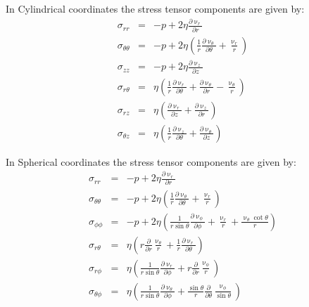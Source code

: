 In Cylindrical coordinates the stress tensor components are given by:
\begin{eqnarray}
\sigma_{rr} &=& -p + 2 \eta \frac{\partial \upnu_r}{\partial r}      \\
\sigma_{\theta\theta} &=& 
 -p + 2\eta \left( \frac{1}{r} \frac{\partial \upnu_\theta}{\partial\theta} +\frac{\upnu_r}{r} \right)    \\
\sigma_{zz} &=& -p + 2 \eta \frac{\partial \upnu_z}{\partial z}      \\
\sigma_{r\theta} &=& \eta \left( \frac{1}{r} \frac{\partial \upnu_r}{\partial \theta} 
+ \frac{\partial \upnu_\theta}{\partial r} - \frac{\upnu_\theta}{r} \right)  \\
\sigma_{rz} &=& \eta \left( \frac{\partial \upnu_r}{\partial z}  + \frac{\partial \upnu_z}{\partial r}\right) \\
\sigma_{\theta z} &=&  \eta \left(  \frac{1}{r} \frac{\partial \upnu_z}{\partial \theta}
+\frac{\partial \upnu_\theta}{\partial z}     \right) 
\end{eqnarray}

In Spherical coordinates the stress tensor components are given by:
\begin{eqnarray}
\sigma_{rr} &=& -p + 2 \eta \frac{\partial \upnu_r}{\partial r}      \\
\sigma_{\theta\theta} &=& 
 -p + 2\eta \left( \frac{1}{r} \frac{\partial \upnu_\theta}{\partial\theta} +\frac{\upnu_r}{r} \right)    \\
\sigma_{\phi\phi} &=& 
-p + 2\eta \left( \frac{1}{r \sin \theta} \frac{\partial \upnu_\phi}{\partial \phi} 
+\frac{\upnu_r}{r}  + \frac{\upnu_\theta \cot \theta}{r} \right) \\
\sigma_{r\theta} &=& \eta\left(  r \frac{\partial}{\partial r} \frac{\upnu_\theta}{r}  
+\frac{1}{r} \frac{\partial \upnu_r}{\partial\theta}   \right)\\
\sigma_{r\phi} &=& \eta \left( \frac{1}{r \sin\theta}\frac{\partial \upnu_r}{\partial \phi} 
+ r \frac{\partial}{\partial r} \frac{\upnu_\phi}{r}  \right)\\
\sigma_{\theta \phi} &=& \eta \left(
\frac{1}{r \sin\theta} \frac{\partial \upnu_\theta}{\partial\phi}
+\frac{\sin\theta}{r} \frac{\partial}{\partial \theta} \frac{\upnu_\phi}{\sin\theta}
\right) 
\end{eqnarray}



